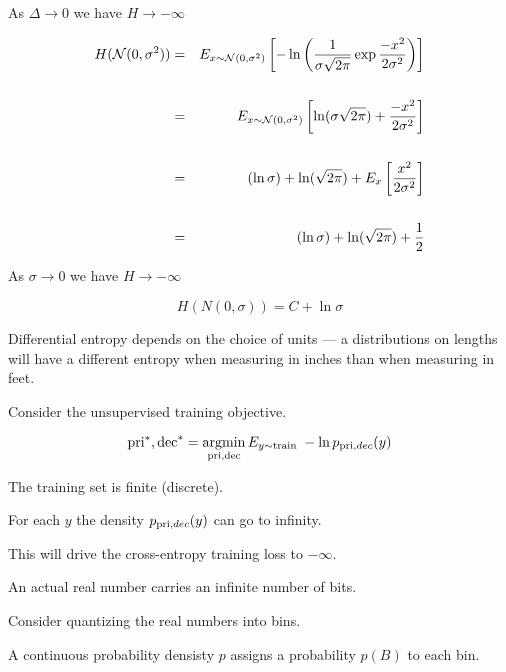 {\vfill
\centerline{As $\Delta \rightarrow 0$ we have $H \rightarrow -\infty$}


\hfill

{\huge
\begin{eqnarray*}
H({\cal N}(0,\sigma^2)) & = & E_{x \sim {\cal N}(0,\sigma^2)} \left[ -\ln \left(\frac{1}{\sigma\sqrt{2\pi}} \exp{\frac{-x^2}{2\sigma^2}}\right)\right] \\
\\
& =& E_{x \sim {\cal N}(0,\sigma^2)} \left[ \ln (\sigma\sqrt{2\pi}) + \frac{-x^2}{2\sigma^2}\right] \\
\\
& = & (\ln\sigma) + \ln(\sqrt{2\pi}) + E_x \left[\frac{x^2}{2\sigma^2}\right] \\
\\
& = & (\ln\sigma) + \ln(\sqrt{2\pi}) + \frac{1}{2} \\
\end{eqnarray*}
}

\vfill
\centerline{As $\sigma \rightarrow 0$ we have $H \rightarrow -\infty$}


$$H(N(0,\sigma)) = C + \ln \sigma$$

\vfill
Differential entropy depends on the choice of units --- a distributions on lengths will have a different entropy
when measuring in inches than when measuring in feet.


Consider the unsupervised training objective.

$$\mathrm{pri}^*,\mathrm{dec}^* = \operatorname*{argmin}_{\mathrm{pri},\mathrm{dec}} E_{y \sim \mathrm{train}}\;-\ln p_{\mathrm{pri},dec}(y)$$

\vfill
The training set is finite (discrete).

\vfill
For each $y$ the density $p_{\mathrm{pri},dec}(y)$ can go to infinity.

\vfill
This will drive the cross-entropy training loss to $-\infty$.



An actual real number carries an infinite number of bits.

\vfill
Consider quantizing the real numbers into bins.

\vfill
A continuous probability densisty $p$ assigns a probability $p(B)$ to each bin.

}
